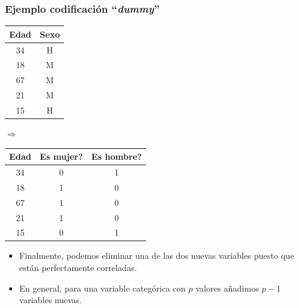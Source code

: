 \documentclass{beamer}
\begin{document}
\begin{frame}
\frametitle{Ejemplo codificación ``\textit{dummy}''}

\begin{tabular}{cc}
\toprule
Edad & Sexo \\
\midrule
34 & H \\
18 & M \\
67 & M \\
21 & M \\
15 & H \\
\bottomrule
\end{tabular}
%
\hfill $\boldsymbol{\Longrightarrow}$ \hfill
%
\begin{tabular}{ccc}
\toprule
Edad & Es mujer? & Es hombre?\\
\midrule
34 & 0 & 1 \\
18 & 1 & 0 \\
67 & 1 & 0 \\
21 & 1 & 0 \\
15 & 0 & 1 \\
\bottomrule
\end{tabular}
\hspace*{0.4em}

\vfill
\begin{itemize}
\item Finalmente, podemos eliminar una de las dos nuevas variables puesto que están perfectamente correladas.

\item En general, para una variable categórica con $p$ valores añadimos $p-1$ variables nuevas.
\end{itemize}
\end{frame}
\end{document}
